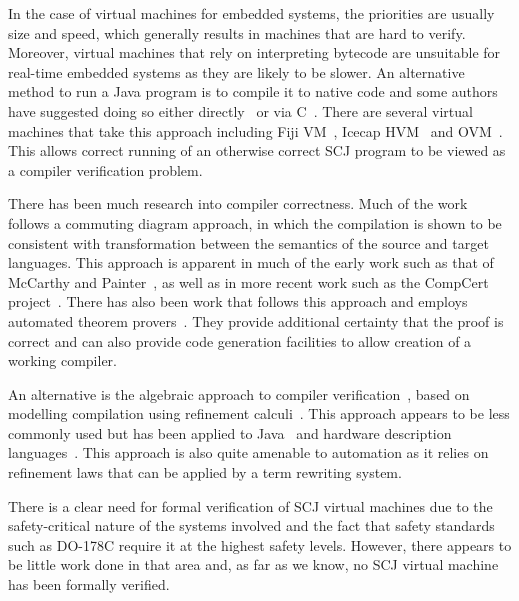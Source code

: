 In the case of virtual machines for embedded systems, the priorities
are usually size and speed, which generally results in machines that
are hard to verify.
Moreover, virtual machines that rely on interpreting bytecode are
unsuitable for real-time embedded systems as they are likely to be
slower.
An alternative method to run a Java program is to compile it to native
code and some authors have suggested doing so either
directly~\cite{schultz2003} or via C~\cite{varma2004}.
There are several virtual machines that take this approach including
Fiji VM~\cite{pizlo2009}, Icecap HVM~\cite{sondergaard2012} and
OVM~\cite{armbruster2007}.
This allows correct running of an otherwise correct SCJ program to be
viewed as a compiler verification problem.

There has been much research into compiler correctness.
Much of the work follows a commuting diagram approach, in which the
compilation is shown to be consistent with transformation between the
semantics of the source and target languages\cite{morris1973,
  thatcher1979}.
This approach is apparent in much of the early work such as that of
McCarthy and Painter~\cite{mccarthy1967}, as well as in more recent
work such as the CompCert project~\cite{leroy2009a, leroy2009b}.
There has also been work that follows this approach and employs
automated theorem provers~\cite{klein2006, milner1972, nipkow2000}.
They provide additional certainty that the proof is correct and can
also provide code generation facilities to allow creation of a working
compiler.

An alternative is the algebraic approach to compiler
verification~\cite{hoare1991, sampaio1993}, based on modelling
compilation using refinement calculi~\cite{back1981, morgan1990,
  morris1987}.
This approach appears to be less commonly used but has been applied to
Java~\cite{duran2005, duran2010} and hardware description
languages~\cite{perna2010, perna2011}.
This approach is also quite amenable to automation as it relies on
refinement laws that can be applied by a term rewriting system.

There is a clear need for formal verification of SCJ virtual machines
due to the safety-critical nature of the systems involved and the fact
that safety standards such as DO-178C require it at the highest safety
levels.
However, there appears to be little work done in that area and, as far
as we know, no SCJ virtual machine has been formally verified.


